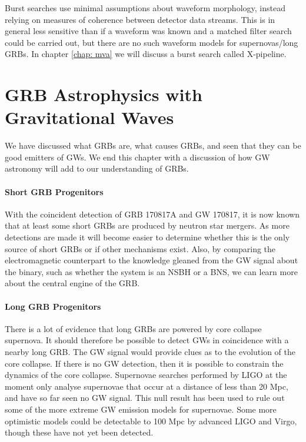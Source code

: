\documentclass[11pt]{cuthesis}
\newcommand{\xpfs}{X-pipeline. }
\begin{document}
Burst searches use minimal assumptions about waveform morphology, instead relying on measures of coherence between detector data streams. This is in general less sensitive than if a waveform was known and a matched filter search could be carried out, but there are no such waveform models for supernovas/long GRBs. In chapter \ref{chap: mva} we will discuss a burst search called \xpfs 

\section{GRB Astrophysics with Gravitational Waves}
We have discussed what GRBs are, what causes GRBs, and seen that they can be good emitters of GWs. We end this chapter with a discussion of how GW astronomy will add to our understanding of GRBs. 

\paragraph{Short GRB Progenitors}
With the coincident detection of GRB 170817A and GW 170817, it is now known that at least some short GRBs are produced by neutron star mergers. As more detections are made it will become easier to determine whether this is the only source of short GRBs or if other mechanisms exist. Also, by comparing the electromagnetic counterpart to the knowledge gleaned from the GW signal about the binary, such as whether the system is an NSBH or a BNS, we can learn more about the central engine of the GRB. 

\paragraph{Long GRB Progenitors}
There is a lot of evidence that long GRBs are powered by core collapse supernova. It should therefore be possible to detect GWs in coincidence with a nearby long GRB. The GW signal would provide clues as to the evolution of the core collapse. If there is no GW detection, then it is possible to constrain the dynamics of the core collapse. Supernovae searches performed by LIGO at the moment only analyse supernovae that occur at a distance of less than 20 Mpc, and have so far seen no GW signal. This null result has been used to rule out some of the more extreme GW emission models for supernovae.\cite{supernova_lvc} Some more optimistic models could be detectable to 100 Mpc by advanced LIGO and Virgo, \cite{piro_pfahl, vanputten2, vanputten1} though these have not yet been detected.
\end{document}
